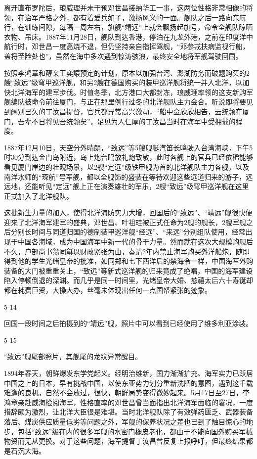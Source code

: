 \documentclass[12pt,UTF8]{ctexbook}
\begin{document}
离开直布罗陀后，琅威理并未干预邓世昌接纳华工一事，这两位性格非常相像的将领，在治军严格之外，都有着爱兵如子，激扬风义的一面。舰队之后一路向东航行，在训练间隙，每隔一周左右，旗舰“靖远”上就会飘扬起旗号，命令全舰队晾晒衣物、吊床。1887年11月28日，舰队到达香港，停泊在九龙外港，之前在印度洋中航行时，邓世昌一度高烧不退，但仍坚持亲自指挥驾舰，“邓参戎扶病监视行船，盖将至险处也”，虽然在海中多次遇到惊涛骇浪，最终安全地将军舰驾驶回国。

按照李鸿章和醇亲王奕譞预定的计划，原本以加强台湾、澎湖防务而破题购买的2艘“致远”级穹甲巡洋舰，和另2艘在德国购买的装甲巡洋舰将统一并入北洋，以加快北洋海军的建军步伐。时值冬季，北方港口大都封冻，琅威理率领的这支新购军舰编队被命令前往厦门，与正在那里例行过冬的北洋舰队主力会合。听说即将要见到阔别已久的丁汝昌提督，官兵都异常高兴激动，“船中佥欣欣相告，云统领在厦门，吾辈不日将见吾统领矣”，足见为人仁厚的丁汝昌当时在海军中受拥戴的程度。

1887年12月10日，天空分外晴朗，“致远”等5艘舰艇汽笛长鸣驶入台湾海峡，下午5时30分到达金门岛附近，岛上炮台鸣放礼炮致敬，此时各舰上的官兵已经依稀能够看见厦门岸边的壮观场景，以2艘“定远”级铁甲舰为首的北洋舰队主力各舰，以及南洋水师的“琛航”号军舰，都以全舰饰的盛装在等待欢迎这些远道归来的游子，远远地，还能听见“定远”舰上正在演奏雄壮的军乐，2艘“致远”级穹甲巡洋舰在这里正式加入了北洋舰队。

这批新生力量的加入，使得北洋海防实力大增，回国后的“致远”、“靖远”舰很快便迎来了北洋海军建军的盛典，邓世昌、叶祖珪被正式任命为2舰的舰长，2艘军舰之后分别长时间与同道归国的德制装甲巡洋舰“经远”、“来远”分别组队使用，经常出现于中国各海域，成为中国海军中新一代的骨干力量。然而就在这次大规模购舰后不久，户部尚书翁同龢以财政紧张为由，奏请2年内禁止海军购买外洋船炮，随即得到他的学生光绪皇帝的批准，如同郑和七下西洋后的禁海令一样，中国海军外购装备的大门被重重关上，“致远”等新式巡洋舰的归来竟成了绝唱，中国的海军建设陷入停顿倒退的深渊。而几乎是同一时间里，光绪皇帝大婚、慈禧太后六十寿诞却都在耗费巨资，大操大办，丝毫未体现出任何一点国帑紧张的迹象。

5-14

回国一段时间之后拍摄到的“靖远”舰，照片中可以看到已经使用了维多利亚涂装。

5-15

“致远”舰尾部照片，其舰尾的龙纹异常醒目。

1894年春天，朝鲜爆发东学党起义。经明治维新，国力渐渐扩充、海军实力已跃居中国之上的日本，早有挑战中国，以使东亚势力划分重新洗牌的意图，遇到这千载难逢的良机，自然不会放过，很快，朝鲜局势变得微妙起来。5月17日至27日，李鸿章亲赴威海检阅海军，性格直率的邓世昌曾当面指出北洋海军面临的窘况，一度措辞颇为激烈，让北洋大臣很是难堪。当时北洋舰队除了有效弹药匮乏、武器装备落后、煤炭供应质量低劣等问题之外，军舰的保养状况之差也已到了触目惊心的地步，包括“致远”级在内的很多军舰的水密门橡皮老化，都由于不能向国外购买军械物资而无从更换。对于这些问题，海军提督丁汝昌曾反复上报呼吁，但最终结果都是石沉大海。
\end{document}
